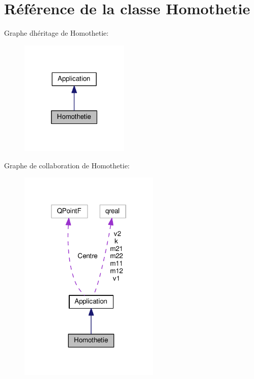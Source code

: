 \hypertarget{class_homothetie}{}\section{Référence de la classe Homothetie}
\label{class_homothetie}


Graphe d\textquotesingle{}héritage de Homothetie\+:\nopagebreak
\begin{figure}[H]
\begin{center}
\leavevmode
\includegraphics[width=147pt]{class_homothetie__inherit__graph}
\end{center}
\end{figure}


Graphe de collaboration de Homothetie\+:\nopagebreak
\begin{figure}[H]
\begin{center}
\leavevmode
\includegraphics[width=190pt]{class_homothetie__coll__graph}
\end{center}
\end{figure}
